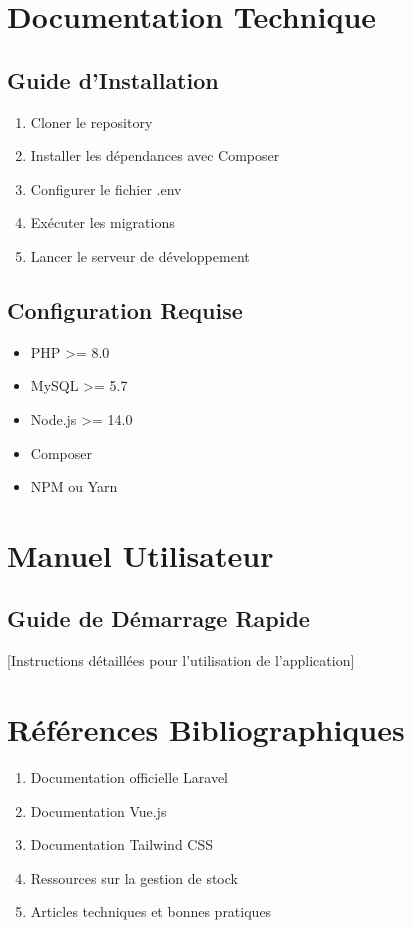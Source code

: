 \documentclass{report}
\begin{document}
\section{Documentation Technique}
\subsection{Guide d'Installation}
\begin{enumerate}
    \item Cloner le repository
    \item Installer les dépendances avec Composer
    \item Configurer le fichier .env
    \item Exécuter les migrations
    \item Lancer le serveur de développement
\end{enumerate}

\subsection{Configuration Requise}
\begin{itemize}
    \item PHP >= 8.0
    \item MySQL >= 5.7
    \item Node.js >= 14.0
    \item Composer
    \item NPM ou Yarn
\end{itemize}

\section{Manuel Utilisateur}
\subsection{Guide de Démarrage Rapide}
[Instructions détaillées pour l'utilisation de l'application]

\section{Références Bibliographiques}
\begin{enumerate}
    \item Documentation officielle Laravel
    \item Documentation Vue.js
    \item Documentation Tailwind CSS
    \item Ressources sur la gestion de stock
    \item Articles techniques et bonnes pratiques
\end{enumerate}

\end{document}
